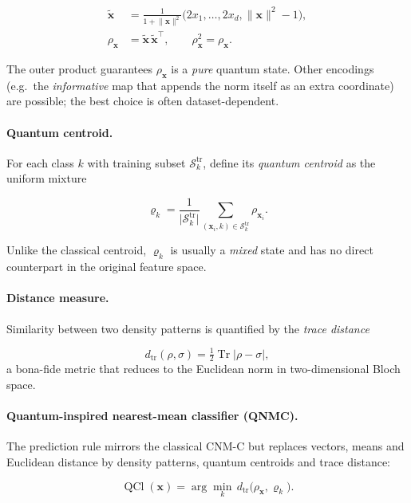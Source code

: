 \documentclass[twocolumn]{article} %
\begin{document}
\begin{align}
\tilde{\mathbf x}
     &=\frac{1}{1+\lVert\mathbf x\rVert^{2}}
       \bigl(2x_{1},\dots,2x_{d},\lVert\mathbf x\rVert^{2}-1\bigr),\\
\rho_{\mathbf x}&=\tilde{\mathbf x}\,\tilde{\mathbf x}^{\!\top},
\qquad
\rho_{\mathbf x}^{2}=\rho_{\mathbf x}.
\label{eq:rho-stereo}
\end{align}

The outer product guarantees \(\rho_{\mathbf x}\) is a \emph{pure} quantum
state.  Other encodings (e.g.\ the \emph{informative} map that appends
the norm itself as an extra coordinate) are possible; the best choice
is often dataset-dependent.

\paragraph{Quantum centroid.}
For each class \(k\) with training subset
\(\mathcal S_{k}^{\mathrm{tr}}\), define its \emph{quantum centroid} as the
uniform mixture

\[
\varrho_{k}=\frac{1}{\lvert\mathcal S_{k}^{\mathrm{tr}}\rvert}
            \sum_{(\mathbf x_i,k)\in\mathcal S_{k}^{\mathrm{tr}}}
            \rho_{\mathbf x_i}.
\]

Unlike the classical centroid, \(\varrho_{k}\) is usually a
\emph{mixed} state and has no direct counterpart in the original
feature space.

\paragraph{Distance measure.}
Similarity between two density patterns is
quantified by the \emph{trace distance}

\[
d_{\operatorname{tr}}(\rho,\sigma)=\tfrac12\operatorname{Tr}\!
\bigl|\rho-\sigma\bigr|,
\]
a bona-fide metric that reduces to the Euclidean norm in
two-dimensional Bloch space.

\paragraph{Quantum-inspired nearest-mean classifier (QNMC).}
The prediction rule mirrors the classical CNM-C but replaces
vectors, means and Euclidean distance by density patterns, quantum
centroids and trace distance:

\[
\operatorname{QCl}(\mathbf x)=
\arg\min_{k}
\,d_{\operatorname{tr}}\!\bigl(\rho_{\mathbf x},\varrho_{k}\bigr).
\]
\end{document}

